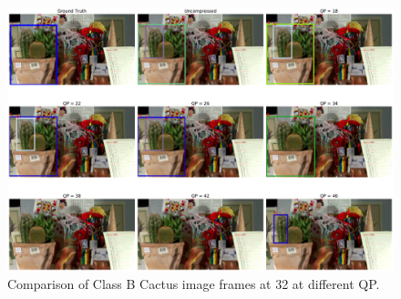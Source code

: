 \begin{figure}[!htbp]
  \centering
  \includegraphics[width=1.0\linewidth]{img/Cactus_58_frame032.pdf}
  \caption[Comparison of Class B Cactus image frames at 32 among different QP]
  {
    Comparison of Class B Cactus image frames at 32 at different QP.
  }
  \label{fig:Cactus_58_frame032}
\end{figure}